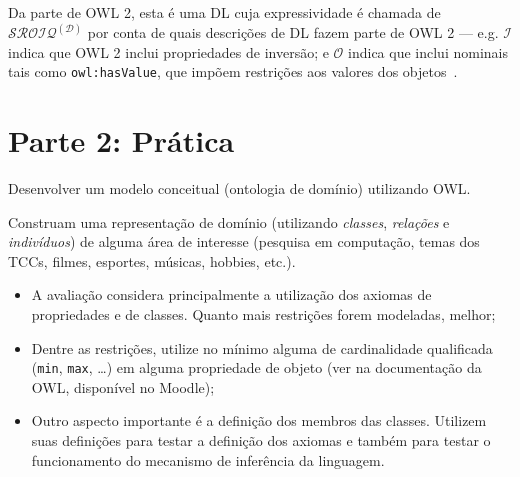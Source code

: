 \documentclass[answers]{exam}
\begin{document}
\begin{questions}
\begin{answer}
            Da parte de OWL 2, esta é uma DL cuja expressividade é chamada de
            $\mathcal{SROIQ^{(D)}}$ por conta de quais descrições de DL fazem
            parte de OWL 2 --- e.g. $\mathcal{I}$ indica que OWL 2 inclui
            propriedades de inversão; e $\mathcal{O}$ indica que inclui
            nominais tais como \texttt{owl:hasValue}, que impõem restrições aos
            valores dos objetos~\cite{wikipedia:description-logic}.
        \end{answer}
    \end{questions}

    \section{Parte 2: Prática}
    \begin{questions}
        \question{}
        Desenvolver um modelo conceitual (ontologia de domínio) utilizando
        OWL\@.

        Construam uma representação de domínio (utilizando \emph{classes},
        \emph{relações} e \emph{indivíduos}) de alguma área de interesse
        (pesquisa em computação, temas dos TCCs, filmes, esportes, músicas,
        hobbies, etc.).

        \begin{superframe}
            \begin{itemize}
                \item A avaliação considera principalmente a utilização dos
                    axiomas de propriedades e de classes. Quanto mais
                    restrições forem modeladas, melhor;

                \item Dentre as restrições, utilize no mínimo alguma de
                    cardinalidade qualificada (\texttt{min}, \texttt{max},
                    \ldots) em alguma propriedade de objeto (ver na
                    documentação da OWL, disponível no Moodle);

                \item Outro aspecto importante é a definição dos membros das
                    classes. Utilizem suas definições para testar a definição
                    dos axiomas e também para testar o funcionamento do
                    mecanismo de inferência da linguagem.
            \end{itemize}
        \end{superframe}
    \end{questions}

    
    
    \nocite{*}
\end{document}
